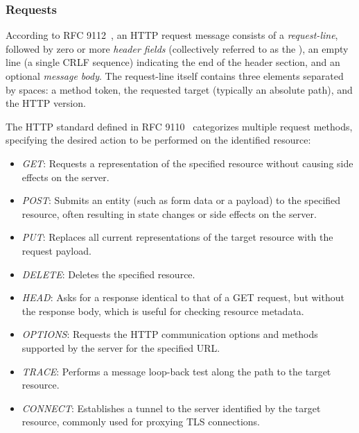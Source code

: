 \subsubsection{Requests}
According to RFC 9112~\cite{rfc9112}, an HTTP request message consists of a \emph{request-line}, followed by zero or more \emph{header fields} (collectively referred to as the ), an empty line (a single CRLF sequence) indicating the end of the header section, and an optional \emph{message body}.
The request-line itself contains three elements separated by spaces: a method token, the requested target (typically an absolute path), and the HTTP version.

The HTTP standard defined in RFC 9110~\cite{rfc9110} categorizes multiple request methods, specifying the desired action to be performed on the identified resource:
\begin{itemize}
    \item \emph{GET}: Requests a representation of the specified resource without causing side effects on the server.
    \item \emph{POST}: Submits an entity (such as form data or a payload) to the specified resource, often resulting in state changes or side effects on the server.
    \item \emph{PUT}: Replaces all current representations of the target resource with the request payload.
    \item \emph{DELETE}: Deletes the specified resource.
    \item \emph{HEAD}: Asks for a response identical to that of a GET request, but without the response body, which is useful for checking resource metadata.
    \item \emph{OPTIONS}: Requests the HTTP communication options and methods supported by the server for the specified URL.
    \item \emph{TRACE}: Performs a message loop-back test along the path to the target resource.
    \item \emph{CONNECT}: Establishes a tunnel to the server identified by the target resource, commonly used for proxying TLS connections.
\end{itemize}


